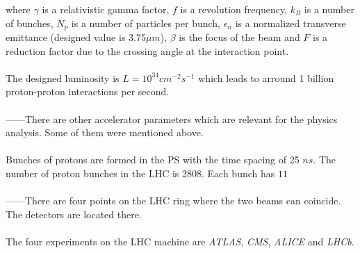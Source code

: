 where $\gamma$ is a relativistic gamma factor, $f$ is a revolution frequency, $k_{B}$ is a number of bunches,
$N_{p}$ is a number of particles per bunch, $\epsilon_{n}$ is a normalized transverse emittance (designed value
is 3.75$\mu m$), $\beta$ is the focus of the beam and $F$ is a reduction factor due to the crossing angle at the 
interaction point.
\\
\\
The designed luminosity is $L = 10^{34} cm^{-2}s^{-1}$ which leads to arround 1 billion proton-proton 
interactions per second.
\\
\\
------There are other accelerator parameters which are relevant for the physics analysis. Some of them were
mentioned above.
\\
\\
Bunches of protons are formed in the PS with the time spacing of 25 $ns$. The number of proton bunches in the LHC is
2808. Each bunch has $11 $
\\
\\
------There are four points on the LHC ring where the two beams can coincide. The detectors are located there.
\\
\\
The four experiments on the LHC machine are \textit{ATLAS}, \textit{CMS}, \textit{ALICE} and \textit{LHCb}.
% 
